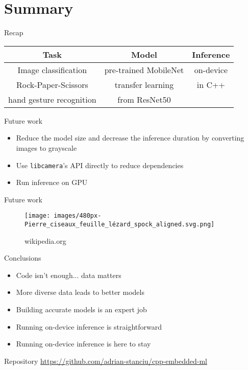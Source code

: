 
\section{Summary}

\begin{frame}{Recap}
  \begin{table}
	\begin{tabular}{|c|c|c|}
	  \hline
		\textbf{Task} & \textbf{Model} & \textbf{Inference} \\
	  \hline
		\multicolumn{1}{|c|}{Image classification} &
		pre-trained MobileNet & on-device \\
	  \cline{1-2}
		\multicolumn{1}{|c|}{Rock-Paper-Scissors} & transfer learning & in C++ \\
		\multicolumn{1}{|c|}{hand gesture recognition} & from ResNet50 & \\
	  \hline
	\end{tabular}
  \end{table}
\end{frame}

\begin{frame}{Future work}
  \begin{itemize}
	\item Reduce the model size and decrease the inference duration by
	converting images to grayscale
	\item Use \texttt{libcamera}'s API directly to reduce dependencies
	\item Run inference on GPU
  \end{itemize}
\end{frame}

\begin{frame}{Future work}
  \begin{figure}
	\texttt{[image: images/480px-Pierre\_ciseaux\_feuille\_lézard\_spock\_aligned.svg.png]}
	\caption{wikipedia.org}
  \end{figure}
\end{frame}

\begin{frame}{Conclusions}
  \begin{itemize}
	\item Code isn't enough... data matters
	\item More diverse data leads to better models
	\item Building accurate models is an expert job
	\item Running on-device inference is straightforward
	\item Running on-device inference is here to stay
  \end{itemize}
\end{frame}

\begin{frame}{Repository}
  \url{https://github.com/adrian-stanciu/cpp-embedded-ml}
\end{frame}

